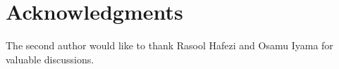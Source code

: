 \documentclass[12pt]{amsart}
\numberwithin{equation}{subsection}
\theoremstyle{plain}
\theoremstyle{definition}
\begin{document}











\section*{Acknowledgments} 
The second author would like to thank Rasool Hafezi and Osamu Iyama for valuable discussions.



%

%

\end{document}
